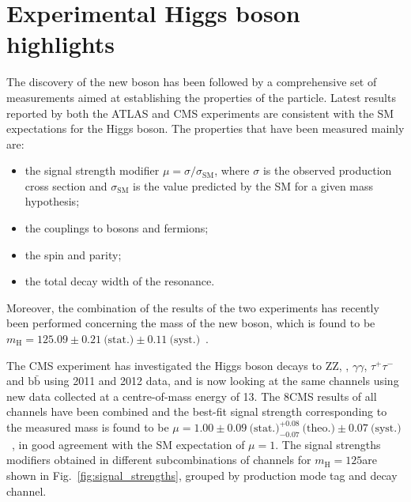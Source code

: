 \section{Experimental Higgs boson highlights}
\label{sec:HiggsExp}

The discovery of the new boson has been followed by a comprehensive set of measurements aimed at establishing the properties of the particle. Latest results reported by both the ATLAS and CMS experiments are consistent with the SM expectations for the Higgs boson. The properties that have been measured mainly are:

\begin{itemize}
\item the signal strength modifier $\mu = \sigma/\sigma_\mathrm{SM}$, where $\sigma$ is the observed production cross section and $\sigma_\mathrm{SM}$ is the value predicted by the SM for a given mass hypothesis;

\item the couplings to bosons and fermions;

\item the spin and parity;

\item the total decay width of the resonance.
\end{itemize}

Moreover, the combination of the results of the two experiments has recently been performed concerning the mass of the new boson, which is found to be $m_\mathrm{H} = 125.09 \pm 0.21 ~\text{(stat.)} \pm 0.11~\text{(syst.)}$\GeV~\cite{Aad:2015zhl}.

The CMS experiment has investigated the Higgs boson decays to ZZ, \WW, $\gamma\gamma$, $\tau^+\tau^-$ and $\mathrm{b \bar b}$ using 2011 and 2012 data, and is now looking at the same channels using new data collected at a centre-of-mass energy of 13\TeV. The 8\TeV CMS results of all channels have been combined and the best-fit signal strength corresponding to the measured mass is found to be $\mu = 1.00 \pm 0.09~\text{(stat.)} ^{+0.08}_{-0.07}~\text{(theo.)} \pm  0.07~\text{(syst.)}$~\cite{Khachatryan:2014jba}, in good agreement with the SM expectation of $\mu=1$.
The signal strengths modifiers obtained in different subcombinations of channels for $m_\mathrm{H}=125$\GeV are shown in Fig.~\ref{fig:signal_strengths}, grouped by production mode tag and decay channel.

